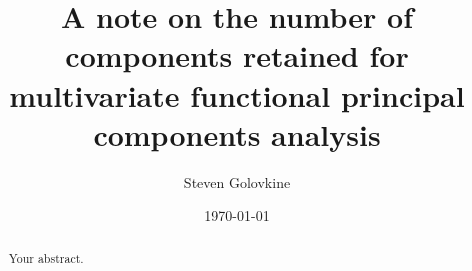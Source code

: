 \documentclass{article}
\title{A note on the number of components retained for multivariate functional principal components analysis}
\author{Steven Golovkine}
\date{\today}
\begin{document}
\maketitle

\begin{abstract}
Your abstract.
\end{abstract}








\end{document}

